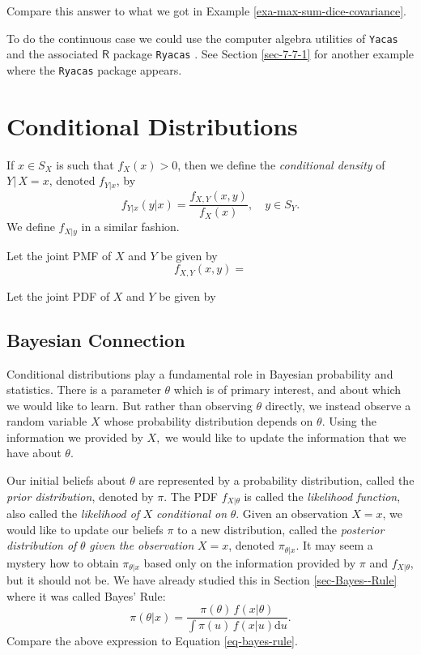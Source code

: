 \documentclass[captions=tableheading]{scrbook}
\begin{document}
Compare this answer to what we got in Example \ref{exa-max-sum-dice-covariance}.

To do the continuous case we could use the computer algebra utilities of \texttt{Yacas} and the associated \(\mathsf{R}\) package \texttt{Ryacas} \cite{ryacas}. See Section \ref{sec-7-7-1} for another example where the \texttt{Ryacas} package appears.
\section{Conditional Distributions}
\label{sec-7-3}
\label{sec-Conditional-Distributions}


If \(x\in S_{X}\) is such that \(f_{X}(x)>0\), then we define the \emph{conditional density} of \(Y|\, X=x\), denoted \(f_{Y|x}\), by 
\begin{equation}
f_{Y|x}(y|x)=\frac{f_{X,Y}(x,y)}{f_{X}(x)},\quad y\in S_{Y}.
\end{equation}
We define \(f_{X|y}\) in a similar fashion.

\begin{example}
Let the joint PMF of \(X\) and \(Y\) be given by
\[
f_{X,Y}(x,y)=
\]
\end{example}

\begin{example}
Let the joint PDF of \(X\) and \(Y\) be given by
\end{example}
\subsection{Bayesian Connection}
\label{sec-7-3-1}


Conditional distributions play a fundamental role in Bayesian probability and statistics. There is a parameter \(\theta\) which is of primary interest, and about which we would like to learn. But rather than observing \(\theta\) directly, we instead observe a random variable \(X\) whose probability distribution depends on \(\theta\). Using the information we provided by \(X,\) we would like to update the information that we have about \(\theta\).

Our initial beliefs about \(\theta\) are represented by a probability distribution, called the \emph{prior distribution}, denoted by \(\pi\). The PDF \(f_{X|\theta}\) is called the \emph{likelihood function}, also called the \emph{likelihood of} \(X\) \emph{conditional on} \(\theta\). Given an observation \(X=x\), we would like to update our beliefs \(\pi\) to a new distribution, called the \emph{posterior distribution of} \(\theta\) \emph{given the observation} \(X=x\), denoted \(\pi_{\theta|x}\). It may seem a mystery how to obtain \(\pi_{\theta|x}\) based only on the information provided by \(\pi\) and \(f_{X|\theta}\), but it should not be. We have already studied this in Section \ref{sec-Bayes--Rule} where it was called Bayes' Rule:
\begin{equation} 
\pi(\theta|x)=\frac{\pi(\theta)\, f(x|\theta)}{\int\pi(u)\, f(x|u)\mathrm{d} u}.
\end{equation} 
Compare the above expression to Equation \ref{eq-bayes-rule}.
\end{document}

